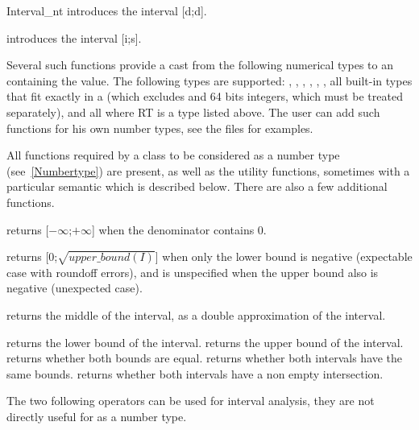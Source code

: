 \begin{ccClass} {Interval_nt}
{introduces the interval [d;d].}

{introduces the interval [i;s].}

{Several such functions provide a cast from the following numerical types
to an  containing the value.  The following types are
supported: , , ,
, , , all built-in
types that fit exactly in a  (which excludes 
and 64 bits integers, which must be treated separately), and all
 where RT is a type listed above.
The user can add such functions for his own number types, see the files
 for examples.}


\ccOperations
{}

All functions required by a class to be considered as a {\cgal} number type
(see~\ref{Numbertype}) are present, as well as the utility functions,
sometimes with a particular semantic which is described below.  There are also
a few additional functions.


 {returns
[$-\infty$;$+\infty$] when the denominator contains 0.}

 {returns
[0;$\sqrt{upper\_bound(I)}$] when only the lower bound is negative (expectable
case with roundoff errors), and is unspecified when the upper bound also is
negative (unexpected case).}

 {returns the
middle of the interval, as a double approximation of the interval.}

 {returns the lower bound of the interval.}
 {returns the upper bound of the interval.}
 {returns whether both bounds are equal.}
 {returns whether both intervals have
the same bounds.}
 {returns whether both intervals have a
non empty intersection.}

The two following operators can be used for interval analysis, they are not
directly useful for  as a number type.


\end{ccClass}
